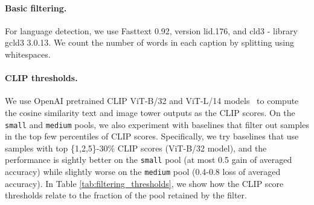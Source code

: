 \paragraph{Basic filtering.} 

For language detection, we use Fasttext 0.92, version lid.176, and cld3 - library gcld3 3.0.13.
We count the number of words in each caption by splitting using whitespaces.


\paragraph{CLIP thresholds.}
We use OpenAI pretrained CLIP ViT-B/32 and ViT-L/14 models~\citep{radford2021learning} to compute the cosine similarity text and image tower outputs as the CLIP scores. On the {\small \texttt{small}} and {\small \texttt{medium}} pools, we also experiment with baselines that filter out samples in the top few percentiles of CLIP scores. Specifically, we try baselines that use samples with top \{1,2,5\}-30\% CLIP scores (ViT-B/32 model), and the performance is sightly better on the {\small \texttt{small}} pool (at most 0.5 gain of averaged accuracy) while slightly worse on the {\small \texttt{medium}} pool (0.4-0.8 loss of averaged accuracy). In Table \ref{tab:filtering_thresholds}, we show how the CLIP score thresholds relate to the fraction of the pool retained by the filter.

